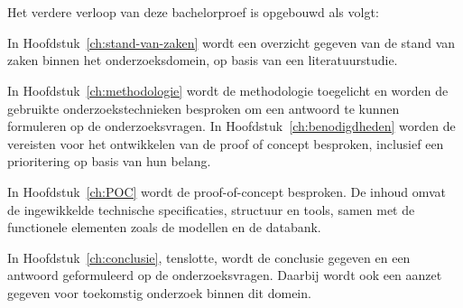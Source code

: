 \section{}%
\label{sec:opzet-bachelorproef}


Het verdere verloop van deze bachelorproef is opgebouwd als volgt:

In Hoofdstuk~\ref{ch:stand-van-zaken} wordt een overzicht gegeven van de stand van zaken binnen het onderzoeksdomein, op basis van een literatuurstudie.

In Hoofdstuk~\ref{ch:methodologie} wordt de methodologie toegelicht en worden de gebruikte onderzoekstechnieken besproken om een antwoord te kunnen formuleren op de onderzoeksvragen.
In Hoofdstuk~\ref{ch:benodigdheden}  worden de vereisten voor het ontwikkelen van de proof of concept besproken, inclusief een prioritering op basis van hun belang.


In Hoofdstuk~\ref{ch:POC} wordt de proof-of-concept besproken. De inhoud omvat de ingewikkelde technische specificaties, structuur en tools, samen met de functionele elementen zoals de modellen en de databank.


In Hoofdstuk~\ref{ch:conclusie}, tenslotte, wordt de conclusie gegeven en een antwoord geformuleerd op de onderzoeksvragen. Daarbij wordt ook een aanzet gegeven voor toekomstig onderzoek binnen dit domein.